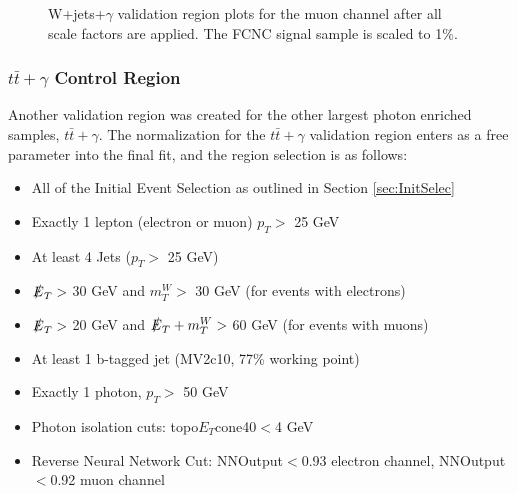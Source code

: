 \begin{figure}[h!]
\hfil  %
\caption{W+jets+$\gamma$ validation region plots for the muon channel after all scale factors are applied.  The FCNC signal sample is scaled to 1\%.} %
\label{fig:VR1muj}
\end{figure}

\subsubsection{$t\bar{t}+\gamma$ Control Region}
Another validation region was created for the other largest photon enriched samples, $t\bar{t}+\gamma$. The normalization for the $t\bar{t}+\gamma$ validation region enters as a free parameter into the final fit, and the region selection is as follows:
\begin{itemize}
\item All of the Initial Event Selection as outlined in Section \ref{sec:InitSelec}
\item Exactly 1 lepton (electron or muon) $p_T >$ 25 GeV
\item At least 4 Jets  ($p_T >$ 25 GeV) 
\item $\slashed{E}_T >$ 30 GeV and $m_T^W >$ 30 GeV (for events with electrons)
\item $\slashed{E}_T >$ 20 GeV and $\slashed{E}_T + m_T^W >$ 60 GeV (for events with muons)
\item At least 1 b-tagged jet (MV2c10, 77\% working point)
\item Exactly 1 photon, $p_T >$ 50 GeV
\item Photon isolation cuts: topo$E_T$cone40$<$4 GeV
\item Reverse Neural Network Cut: NNOutput$<$0.93 electron channel, NNOutput$<$0.92 muon channel
\end{itemize}

